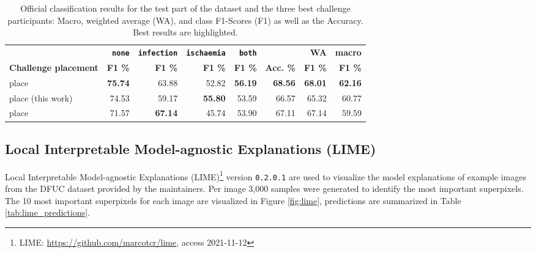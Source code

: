 \documentclass[runningheads]{llncs}
\begin{document}
\begin{table}[ht!]
	\begin{center}
		\caption{Official classification results for the test part of the dataset and the three best challenge participants: Macro, weighted average (WA), and class F1-Scores (F1) as well as the Accuracy. Best results are highlighted.}\label{tab:ResultsChallenge}
		\begin{tabularx}{\textwidth}{|X|r|r|r|r|r|r|r|}
			\hline
			\textbf{} 
			& \textbf{\texttt{none}} & \textbf{\texttt{infection}} & \textbf{\texttt{ischaemia}} & \textbf{\texttt{both}}&\textbf{}&\textbf{WA}&\textbf{macro} \\
			\textbf{Challenge placement}  
			& \textbf{F1 \%} & \textbf{F1 \%} & \textbf{F1 \%} & \textbf{F1 \%} & \textbf{Acc. \%} &\textbf{F1 \%} & \textbf{F1 \%}\\\hline\hline
			\nth{1} place \cite{galdran2021convolutional}&\textbf{75.74}&63.88&52.82&\textbf{56.19}&\textbf{68.56}&\textbf{68.01}&\textbf{62.16}\\
			\nth{2} place (this work) 
			&74.53&59.17&\textbf{55.80}&53.59&66.57&65.32&60.77\\
			\nth{3} place &71.57&\textbf{67.14}&45.74&53.90&67.11&67.14&59.59\\
			\hline
		\end{tabularx}		
	\end{center}
\end{table}




\subsection{Local Interpretable Model-agnostic Explanations (LIME)}

Local Interpretable Model-agnostic Explanations (LIME)\footnote{LIME: \url{https://github.com/marcotcr/lime}, access 2021-11-12} \cite{Ribeiro2016lime} version \texttt{0.2.0.1} are used to visualize the model explanations of example images from the DFUC dataset provided by the maintainers. Per image 3,000 samples were generated to identify the most important superpixels. The 10 most important superpixels for each image are visualized in Figure \ref{fig:lime}, predictions are summarized in Table \ref{tab:lime_predictions}.
\end{document}
